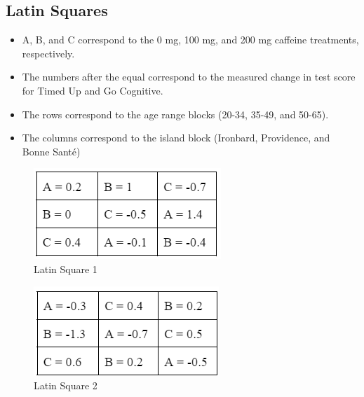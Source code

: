 \documentclass[11pt,a4paper,twoside]{tau-book}
\begin{document}
\subsection{Latin Squares}
\begin{itemize}
    \item A, B, and C correspond to the 0 mg, 100 mg, and 200 mg caffeine treatments, respectively.
    \item The numbers after the equal correspond to the measured change in test score for Timed Up and Go Cognitive.
    \item The rows correspond to the age range blocks (20-34, 35-49, and 50-65).
    \item The columns correspond to the island block (Ironbard, Providence, and Bonne Santé)
\end{itemize}


\begin{figure}[H]
        \centering
    \includegraphics[width=0.5\columnwidth]{Figures/latin square 1.png}
        \caption{Latin Square 1}
        \label{fig:Latin Square 1}
\end{figure}

\begin{figure}[H]
        \centering
    \includegraphics[width=0.5\columnwidth]{Figures/latin square 2.png}
        \caption{Latin Square 2}
        \label{fig:Latin Square 2}
\end{figure}
\end{document}
